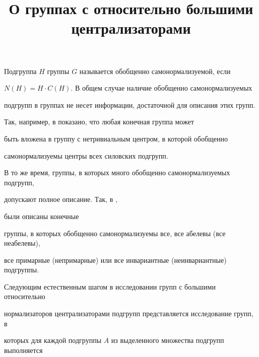 \title{О группах с относительно большими централизаторами}





\date{}




\pagestyle{plain} %







\maketitle


\label{begin}








Подгруппа $H$ группы $G$ называется обобщенно самонормализуемой, если


$N(H)=H\cdot C(H)$. В общем случае наличие обобщенно самонормализуемых


подгрупп в группах не несет информации, достаточной для описания этих групп.


Так, например, в \cite{os} показано, что любая конечная группа может


быть вложена в группу с нетривиальным центром, в которой обобщенно


самонормализуемы центры всех силовских подгрупп.





В то же время, группы, в которых много обобщенно самонормализуемых подгрупп,


допускают полное описание. Так, в \cite{ant1},


\cite{ant2} были описаны конечные


группы, в которых обобщенно самонормализуемы все, все абелевы (все неабелевы),


все примарные (непримарные) или все инвариантные (неинвариантные) подгруппы.





Следующим естественным шагом в исследовании групп с большими относительно


нормализаторов централизаторами подгрупп представляется исследование групп, в


которых для каждой подгруппы $A$ из выделенного множества подгрупп выполняется


